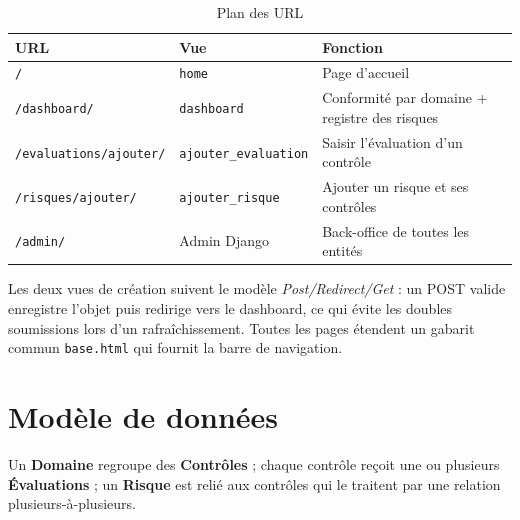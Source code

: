 \documentclass[11pt,a4paper]{article}
\newcommand{\code}[1]{\texttt{#1}}
\begin{document}
\begin{table}[H]
\centering\small
\begin{tabular}{@{}lll@{}}
\toprule
\textbf{URL} & \textbf{Vue} & \textbf{Fonction}\\
\midrule
\code{/} & \code{home} & Page d'accueil\\
\code{/dashboard/} & \code{dashboard} & Conformité par domaine + registre des risques\\
\code{/evaluations/ajouter/} & \code{ajouter\_evaluation} & Saisir l'évaluation d'un contrôle\\
\code{/risques/ajouter/} & \code{ajouter\_risque} & Ajouter un risque et ses contrôles\\
\code{/admin/} & Admin Django & Back-office de toutes les entités\\
\bottomrule
\end{tabular}
\caption{Plan des URL}
\end{table}

Les deux vues de création suivent le modèle \emph{Post/Redirect/Get} : un POST valide enregistre l'objet puis redirige vers le dashboard, ce qui évite les doubles soumissions lors d'un rafraîchissement. Toutes les pages étendent un gabarit commun \code{base.html} qui fournit la barre de navigation.

\section{Modèle de données}
Un \textbf{Domaine} regroupe des \textbf{Contrôles} ; chaque contrôle reçoit une ou plusieurs \textbf{Évaluations} ; un \textbf{Risque} est relié aux contrôles qui le traitent par une relation plusieurs-à-plusieurs.
\end{document}
